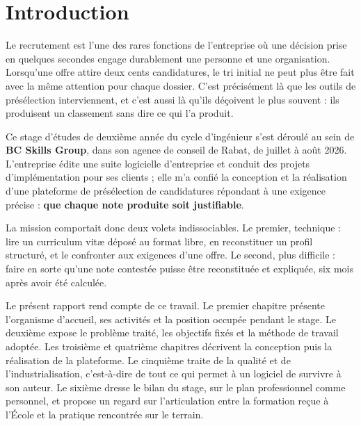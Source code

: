 \documentclass[12pt,a4paper]{report}
\begin{document}
\listoftables
{}

\listoffigures
{}

\chapter*{Introduction}

Le recrutement est l'une des rares fonctions de l'entreprise où une décision
prise en quelques secondes engage durablement une personne et une
organisation. Lorsqu'une offre attire deux cents candidatures, le tri initial
ne peut plus être fait avec la même attention pour chaque dossier. C'est
précisément là que les outils de présélection interviennent, et c'est aussi là
qu'ils déçoivent le plus souvent : ils produisent un classement sans dire ce
qui l'a produit.

Ce stage d'études de deuxième année du cycle d'ingénieur s'est déroulé au sein
de \textbf{BC Skills Group}, dans son agence de conseil de Rabat, de juillet à
août 2026. L'entreprise édite une suite logicielle d'entreprise et conduit des
projets d'implémentation pour ses clients ; elle m'a confié la conception et la
réalisation d'une plateforme de présélection de candidatures répondant à une
exigence précise : \textbf{que chaque note produite soit justifiable}.

La mission comportait donc deux volets indissociables. Le premier, technique :
lire un curriculum vitæ déposé au format libre, en reconstituer un profil
structuré, et le confronter aux exigences d'une offre. Le second, plus
difficile : faire en sorte qu'une note contestée puisse être reconstituée et
expliquée, six mois après avoir été calculée.

Le présent rapport rend compte de ce travail. Le premier chapitre présente
l'organisme d'accueil, ses activités et la position occupée pendant le stage.
Le deuxième expose le problème traité, les objectifs fixés et la méthode de
travail adoptée. Les troisième et quatrième chapitres décrivent la conception
puis la réalisation de la plateforme. Le cinquième traite de la qualité et de
l'industrialisation, c'est-à-dire de tout ce qui permet à un logiciel de
survivre à son auteur. Le sixième dresse le bilan du stage, sur le plan
professionnel comme personnel, et propose un regard sur l'articulation entre
la formation reçue à l'École et la pratique rencontrée sur le terrain.
\end{document}
